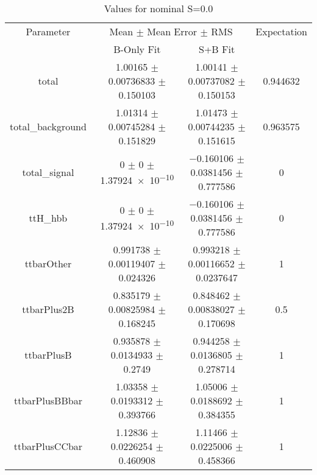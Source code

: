 \begin{table}
\centering
\caption{Values for nominal S=0.0}
\begin{tabular}{cccc}
\toprule
Parameter & \multicolumn{2}{c}{Mean $\pm$ Mean Error $\pm$ RMS} & Expectation\\
 & B-Only Fit & S+B Fit & \\
\midrule
total & \num{1.00165} $\pm$ \num{0.00736833} $\pm$ \num{0.150103} & \num{1.00141} $\pm$ \num{0.00737082} $\pm$ \num{0.150153} & \num{0.944632}\\
total\_background & \num{1.01314} $\pm$ \num{0.00745284} $\pm$ \num{0.151829} & \num{1.01473} $\pm$ \num{0.00744235} $\pm$ \num{0.151615} & \num{0.963575}\\
total\_signal & \num{0} $\pm$ \num{0} $\pm$ \num{1.37924e-10} & \num{-0.160106} $\pm$ \num{0.0381456} $\pm$ \num{0.777586} & \num{0}\\
ttH\_hbb & \num{0} $\pm$ \num{0} $\pm$ \num{1.37924e-10} & \num{-0.160106} $\pm$ \num{0.0381456} $\pm$ \num{0.777586} & \num{0}\\
ttbarOther & \num{0.991738} $\pm$ \num{0.00119407} $\pm$ \num{0.024326} & \num{0.993218} $\pm$ \num{0.00116652} $\pm$ \num{0.0237647} & \num{1}\\
ttbarPlus2B & \num{0.835179} $\pm$ \num{0.00825984} $\pm$ \num{0.168245} & \num{0.848462} $\pm$ \num{0.00838027} $\pm$ \num{0.170698} & \num{0.5}\\
ttbarPlusB & \num{0.935878} $\pm$ \num{0.0134933} $\pm$ \num{0.2749} & \num{0.944258} $\pm$ \num{0.0136805} $\pm$ \num{0.278714} & \num{1}\\
ttbarPlusBBbar & \num{1.03358} $\pm$ \num{0.0193312} $\pm$ \num{0.393766} & \num{1.05006} $\pm$ \num{0.0188692} $\pm$ \num{0.384355} & \num{1}\\
ttbarPlusCCbar & \num{1.12836} $\pm$ \num{0.0226254} $\pm$ \num{0.460908} & \num{1.11466} $\pm$ \num{0.0225006} $\pm$ \num{0.458366} & \num{1}\\
\bottomrule
\end{tabular}
\end{table}